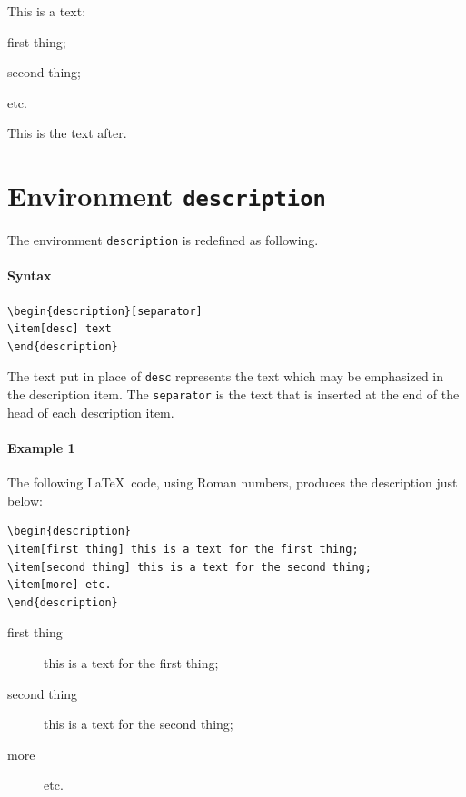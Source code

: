 \documentclass[book,taskpackage,specpackage,codepackage]{upmethodology-document}
\begin{document}
This is a text: \begin{inlineenumeration}
\item first thing;
\item second thing;
\item etc.
\end{inlineenumeration} This is the text after.


\section{Environment \texttt{description}}

The environment \texttt{description} is redefined as following.

\paragraph{Syntax}
\begin{verbatim}
\begin{description}[separator]
\item[desc] text
\end{description}
\end{verbatim}
The text put in place of \texttt{desc} represents the text which may be emphasized in the description item.
The \texttt{separator} is the text that is inserted at the end of the head of each description item.


\paragraph{Example 1} The following \LaTeX~code, using Roman numbers, produces the description just below:
\begin{verbatim}
\begin{description}
\item[first thing] this is a text for the first thing;
\item[second thing] this is a text for the second thing;
\item[more] etc.
\end{description}
\end{verbatim}

\begin{description}
\item[first thing] this is a text for the first thing;
\item[second thing] this is a text for the second thing;
\item[more] etc.
\end{description}
\end{document}
